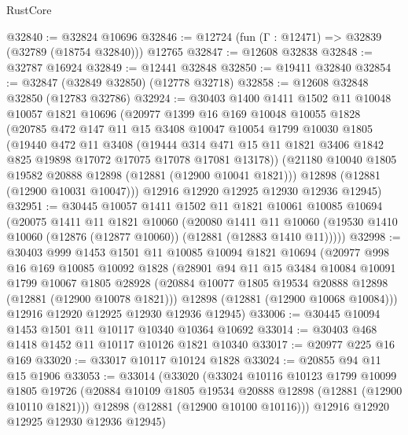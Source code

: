 \begin{lexlean}{RustCore}
\begin{coremodule}
@32840 := @32824 @10696
@32846 := @12724 (fun (Γ : @12471) => @32839 (@32789 (@18754 @32840))) @12765
@32847 := @12608 @32838
@32848 := @32787 @16924
@32849 := @12441 @32848
@32850 := @19411 @32840
@32854 := @32847 (@32849 @32850) (@12778 @32718)
@32858 := @12608 @32848 @32850 (@12783 @32786)
@32924 := @30403
    @1400
    @1411
    @1502
    @11
    @10048
    @10057
    @1821
    @10696
    (@20977
      @1399
      @16
      @169
      @10048
      @10055
      @1828
      (@20785
        @472
        @147
        @11
        @15
        @3408
        @10047
        @10054
        @1799
        @10030
        @1805
        (@19440
          @472
          @11
          @3408
          (@19444
            @314
            @471
            @15
            @11
            @1821
            @3406
            @1842
            @825
            @19898
            @17072
            @17075
            @17078
            @17081
            @13178))
        (@21180 @10040 @1805 @19582 @20888 @12898 (@12881 (@12900 @10041 @1821)))
        @12898
        (@12881 (@12900 @10031 @10047)))
      @12916
      @12920
      @12925
      @12930
      @12936
      @12945)
@32951 := @30445
    @10057
    @1411
    @1502
    @11
    @1821
    @10061
    @10085
    @10694
    (@20075
      @1411
      @11
      @1821
      @10060
      (@20080
        @1411
        @11
        @10060
        (@19530 @1410 @10060 (@12876 (@12877 @10060)) (@12881 (@12883 @1410 @11)))))
@32998 := @30403
    @999
    @1453
    @1501
    @11
    @10085
    @10094
    @1821
    @10694
    (@20977
      @998
      @16
      @169
      @10085
      @10092
      @1828
      (@28901
        @94
        @11
        @15
        @3484
        @10084
        @10091
        @1799
        @10067
        @1805
        @28928
        (@20884 @10077 @1805 @19534 @20888 @12898 (@12881 (@12900 @10078 @1821)))
        @12898
        (@12881 (@12900 @10068 @10084)))
      @12916
      @12920
      @12925
      @12930
      @12936
      @12945)
@33006 := @30445 @10094 @1453 @1501 @11 @10117 @10340 @10364 @10692
@33014 := @30403 @468 @1418 @1452 @11 @10117 @10126 @1821 @10340
@33017 := @20977 @225 @16 @169
@33020 := @33017 @10117 @10124 @1828
@33024 := @20855 @94 @11 @15 @1906
@33053 := @33014
    (@33020
      (@33024
        @10116
        @10123
        @1799
        @10099
        @1805
        @19726
        (@20884 @10109 @1805 @19534 @20888 @12898 (@12881 (@12900 @10110 @1821)))
        @12898
        (@12881 (@12900 @10100 @10116)))
      @12916
      @12920
      @12925
      @12930
      @12936
      @12945)

\end{coremodule}
\end{lexlean}
